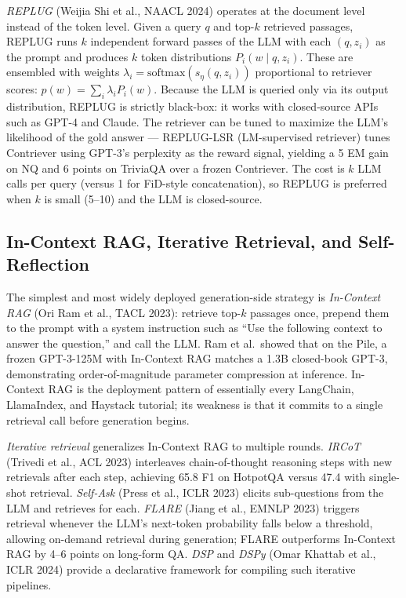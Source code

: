 \emph{REPLUG} (Weijia Shi et al., NAACL 2024) operates at the document level instead of the token level. Given a query \(q\) and top-\(k\) retrieved passages, REPLUG runs \(k\) independent forward passes of the LLM with each \((q, z_i)\) as the prompt and produces \(k\) token distributions \(P_i(w \mid q, z_i)\). These are ensembled with weights \(\lambda_i = \text{softmax}(s_\eta(q, z_i))\) proportional to retriever scores: \(p(w) = \sum_i \lambda_i P_i(w)\). Because the LLM is queried only via its output distribution, REPLUG is strictly black-box: it works with closed-source APIs such as GPT-4 and Claude. The retriever can be tuned to maximize the LLM's likelihood of the gold answer --- REPLUG-LSR (LM-supervised retriever) tunes Contriever using GPT-3's perplexity as the reward signal, yielding a 5 EM gain on NQ and 6 points on TriviaQA over a frozen Contriever. The cost is \(k\) LLM calls per query (versus 1 for FiD-style concatenation), so REPLUG is preferred when \(k\) is small (5--10) and the LLM is closed-source.

\subsection{In-Context RAG, Iterative Retrieval, and Self-Reflection}\label{in-context-rag-iterative-retrieval-and-self-reflection}

The simplest and most widely deployed generation-side strategy is \emph{In-Context RAG} (Ori Ram et al., TACL 2023): retrieve top-\(k\) passages once, prepend them to the prompt with a system instruction such as ``Use the following context to answer the question,'' and call the LLM. Ram et al.~showed that on the Pile, a frozen GPT-3-125M with In-Context RAG matches a 1.3B closed-book GPT-3, demonstrating order-of-magnitude parameter compression at inference. In-Context RAG is the deployment pattern of essentially every LangChain, LlamaIndex, and Haystack tutorial; its weakness is that it commits to a single retrieval call before generation begins.

\emph{Iterative retrieval} generalizes In-Context RAG to multiple rounds. \emph{IRCoT} (Trivedi et al., ACL 2023) interleaves chain-of-thought reasoning steps with new retrievals after each step, achieving 65.8 F1 on HotpotQA versus 47.4 with single-shot retrieval. \emph{Self-Ask} (Press et al., ICLR 2023) elicits sub-questions from the LLM and retrieves for each. \emph{FLARE} (Jiang et al., EMNLP 2023) triggers retrieval whenever the LLM's next-token probability falls below a threshold, allowing on-demand retrieval during generation; FLARE outperforms In-Context RAG by 4--6 points on long-form QA. \emph{DSP} and \emph{DSPy} (Omar Khattab et al., ICLR 2024) provide a declarative framework for compiling such iterative pipelines.


